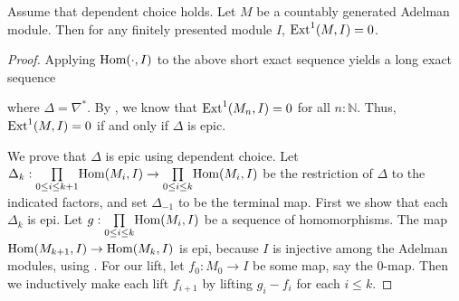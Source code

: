 \begin{proposition}
  Assume that dependent choice holds.
  Let $M$ be a countably generated Adelman module.
  Then for any finitely presented module $I$, $\textup{Ext}^1(M,I)=0$.
\end{proposition}

\begin{proof}
  Applying $\textup{Hom}(\cdot, I)$ to the above short exact sequence yields a long exact sequence
  \begin{center}
  \end{center}
  where $\Delta = \nabla^*$.
  By , we know that $\textup{Ext}^1(M_n, I) = 0$ for all $n : \mathbb{N}$.
  Thus, $\textup{Ext}^1(M,I) = 0$ if and only if $\Delta$ is epic.

  We prove that $\Delta$ is epic using dependent choice.
  Let $\Delta_k : \underset{0 \leq i \leq k + 1}{\prod} \textup{Hom}(M_i, I) \rightarrow \underset{0 \leq i \leq k}{\prod} \textup{Hom}(M_i, I)$ be the restriction of $\Delta$ to the indicated factors, and set $\Delta_{-1}$ to be the terminal map.
  First we show that each $\Delta_k$ is epi.
  Let $g : \underset{0 \leq i \leq k}{\prod} \textup{Hom}(M_i, I)$ be a sequence of homomorphisms.
  The map $\textup{Hom}(M_{k+1},I) \rightarrow \textup{Hom}(M_k, I)$ is epi, because $I$ is injective among the Adelman modules, using .
  For our lift, let $f_0 : M_0 \rightarrow I$ be some map, say the $0$-map.
  Then we inductively make each lift $f_{i+1}$ by lifting $g_i-f_i$ for each $i \leq k$.


\end{proof}

